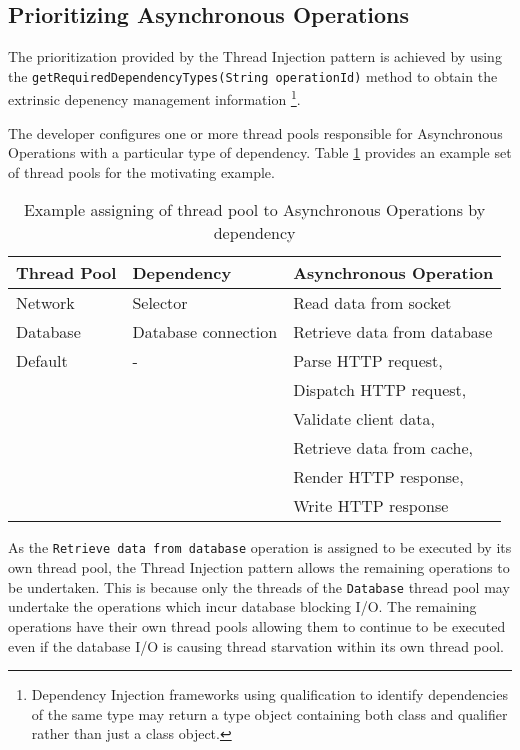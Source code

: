\documentclass{article}
\begin{document}
\subsection{Prioritizing Asynchronous Operations}

The prioritization provided by the Thread Injection pattern is achieved by using
the \texttt{getRequiredDependencyTypes(String operationId)} method to obtain the
extrinsic depenency management information \footnote{Dependency Injection
frameworks using qualification to identify dependencies of the same type may
return a type object containing both class and qualifier rather than just a
class object.}.

The developer configures one or more thread pools responsible for Asynchronous
Operations with a particular type of dependency. Table
\ref{tab:example_request_thread_pools} provides an example set of thread pools
for the motivating example.

\begin{table}[!t]
\renewcommand{\arraystretch}{1.3}
\caption{Example assigning of thread pool to Asynchronous Operations by dependency}
\label{tab:example_request_thread_pools}
\centering
\begin{tabular}{l||l||l}
\hline
\bfseries Thread Pool & \bfseries Dependency & \bfseries Asynchronous Operation \\
\hline\hline
Network & Selector & Read data from socket \\
\hline
Database & Database connection & Retrieve data from database \\
\hline
Default & - & Parse HTTP request, \\
& & Dispatch HTTP request, \\
& & Validate client data, \\ 
& & Retrieve data from cache, \\
& & Render HTTP response, \\
& & Write HTTP response \\
\hline
\end{tabular}
\end{table}

As the \texttt{Retrieve data from database} operation is assigned to be executed
by its own thread pool, the Thread Injection pattern allows the remaining
operations to be undertaken.  This is because only the threads of the
\texttt{Database} thread pool may undertake the operations which incur database
blocking I/O.  The remaining operations have their own thread pools allowing
them to continue to be executed even if the database I/O is causing thread
starvation within its own thread pool.
\end{document}

